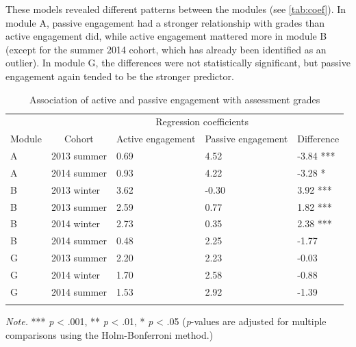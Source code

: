 \documentclass[
  english,
  man,mask,floatsintext]{apa6}
\begin{document}
These models revealed different patterns between the modules (see \autoref{tab:coef}). In module A, passive engagement had a stronger relationship with grades than active engagement did, while active engagement mattered more in module B (except for the summer 2014 cohort, which has already been identified as an outlier). In module G, the differences were not statistically significant, but passive engagement again tended to be the stronger predictor.



\begin{table}[tbp]

\begin{center}
\begin{threeparttable}

\caption{\label{tab:coef}Association of active and passive engagement with assessment grades}

\footnotesize{

\begin{tabular}{lllll}
\toprule
 &  & \multicolumn{2}{c}{Regression coefficients}  &\\
\cmidrule(r){3-4}
Module & \multicolumn{1}{c}{Cohort} & \multicolumn{1}{c}{Active engagement} & \multicolumn{1}{c}{Passive engagement} & \multicolumn{1}{c}{Difference}\\
\midrule
A & 2013 summer & 0.69 & 4.52 & -3.84 ***\\
A & 2014 summer & 0.93 & 4.22 & -3.28 *\\ \midrule
B & 2013 winter & 3.62 & -0.30 & 3.92 ***\\
B & 2013 summer & 2.59 & 0.77 & 1.82 ***\\
B & 2014 winter & 2.73 & 0.35 & 2.38 ***\\
B & 2014 summer & 0.48 & 2.25 & -1.77\\ \midrule
G & 2013 summer & 2.20 & 2.23 & -0.03\\
G & 2014 winter & 1.70 & 2.58 & -0.88\\
G & 2014 summer & 1.53 & 2.92 & -1.39\\
\bottomrule
\addlinespace
\end{tabular}

}

\begin{tablenotes}[para]
\normalsize{\textit{Note.} *** \emph{p} \textless{} .001, ** \emph{p} \textless{} .01, * \emph{p} \textless{} .05 (\emph{p}-values are adjusted for multiple comparisons using the Holm-Bonferroni method.)}
\end{tablenotes}

\end{threeparttable}
\end{center}

\end{table}
\end{document}
